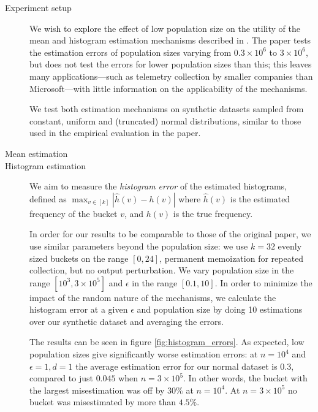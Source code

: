 \documentclass[12pt]{article}
\begin{document}
\begin{description}
    \item[Experiment setup] We wish to explore the effect of low population size on the utility of the mean and histogram estimation mechanisms described in \cite{microsoft_telemetry}. The paper tests the estimation errors of population sizes varying from $0.3\times10^6$ to $3\times10^6$, but does not test the errors for lower population sizes than this; this leaves many applications---such as telemetry collection by smaller companies than Microsoft---with little information on the applicability of the mechanisms.
    
    We test both estimation mechanisms on synthetic datasets sampled from constant, uniform and (truncated) normal distributions, similar to those used in the empirical evaluation in the paper.
    
    \item[Mean estimation]
    
    \item[Histogram estimation]
    We aim to measure the \emph{histogram error} of the estimated histograms, defined as $\max_{v\in[k]} |\hat{h}(v)-h(v)|$ where $\hat{h}(v)$ is the estimated frequency of the bucket $v$, and $h(v)$ is the true frequency.
    
    In order for our results to be comparable to those of the original paper, we use similar parameters beyond the population size: we use $k=32$ evenly sized buckets on the range $[0,24]$, permanent memoization for repeated collection, but no output perturbation. We vary population size in the range $[10^3, 3\times10^5]$ and $\epsilon$ in the range $[0.1, 10]$. In order to minimize the impact of the random nature of the mechanisms, we calculate the histogram error at a given $\epsilon$ and population size by doing 10 estimations over our synthetic dataset and averaging the errors.
    
    The results can be seen in figure \ref{fig:histogram_errors}. As expected, low population sizes give significantly worse estimation errors: at $n=10^4$ and $\epsilon=1, d=1$ the average estimation error for our normal dataset is $0.3$, compared to just $0.045$ when $n=3\times10^5$. In other words, the bucket with the largest misestimation was off by $30\%$ at $n=10^4$. At $n=3\times10^5$ no bucket was misestimated by more than $4.5\%$.
    

\end{description}
\end{document}

